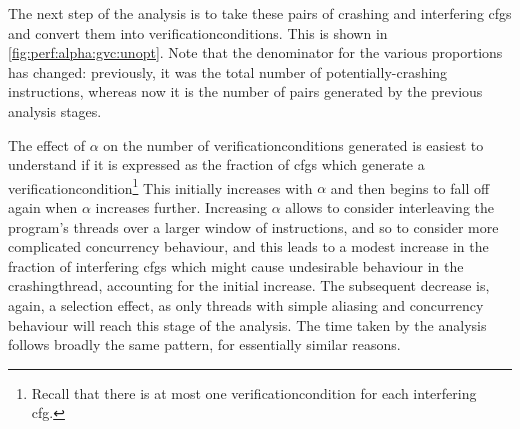 The next step of the analysis is to take these pairs of crashing
{\StateMachines} and interfering \glspl{cfg} and convert them into
\glspl{verificationcondition}.  This is shown in
\autoref{fig:perf:alpha:gvc:unopt}.  Note that the denominator for
the various proportions has changed: previously, it was the total
number of potentially-crashing instructions, whereas now it is the
number of pairs generated by the previous analysis stages.

The effect of $\alpha$ on the number of \glspl{verificationcondition}
generated is easiest to understand if it is expressed as the fraction
of \glspl{cfg} which generate a
\gls{verificationcondition}\footnote{Recall that there is at most one
  \gls{verificationcondition} for each interfering \gls{cfg}.}  This
initially increases with $\alpha$ and then begins to fall off again
when $\alpha$ increases further.  Increasing $\alpha$ allows
{\technique} to consider interleaving the program's threads over a
larger window of instructions, and so to consider more complicated
concurrency behaviour, and this leads to a modest increase in the
fraction of interfering \glspl{cfg} which might cause undesirable
behaviour in the \gls{crashingthread}, accounting for the initial
increase.  The subsequent decrease is, again, a selection effect, as
only threads with simple aliasing and concurrency behaviour will reach
this stage of the analysis.  The time taken by the analysis follows
broadly the same pattern, for essentially similar reasons.

\begin{sanefig}
  \caption{Effect of the $\alpha$ parameter on the number of
    \glspl{verificationcondition} generated and the time taken to do
    so.  All timeouts in earlier stages of the analysis are excluded.
    The time taken includes building the interfering {\StateMachine},
    rederiving crashing {\StateMachine}, deriving \gls{ic-atomic}
    constraints, building the \gls{verificationcondition}, and the
    final satisfiability check.}
  \label{fig:perf:alpha:gvc:unopt}
\end{sanefig}

\begin{sanefig}
  \caption{Effect of the $\alpha$ parameter on the time taken to build
    the \gls{crashingthread} {\StateMachines} for an optimised build
    of MySQL.}
  \label{fig:perf:alpha:bpm:opt}
\end{sanefig}

